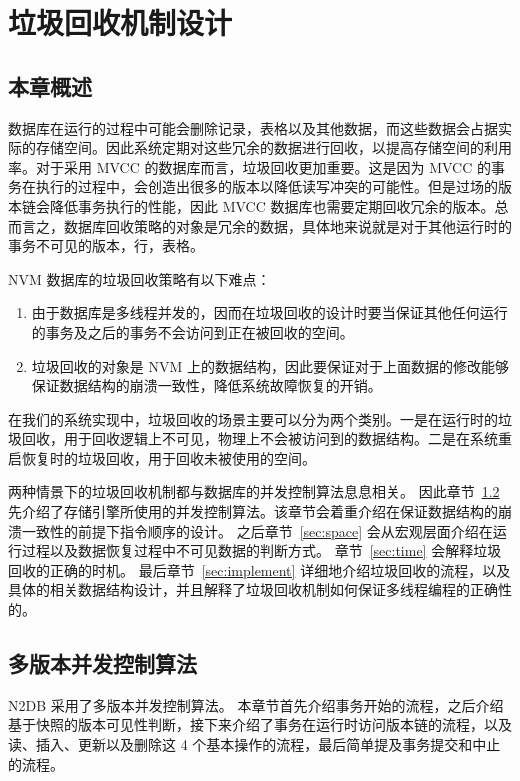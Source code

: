 
\chapter{垃圾回收机制设计}

\section{本章概述}


数据库在运行的过程中可能会删除记录，表格以及其他数据，而这些数据会占据实际的存储空间。因此系统定期对这些冗余的数据进行回收，以提高存储空间的利用率。对于采用 MVCC 的数据库而言，垃圾回收更加重要。这是因为 MVCC 的事务在执行的过程中，会创造出很多的版本以降低读写冲突的可能性。但是过场的版本链会降低事务执行的性能，因此 MVCC 数据库也需要定期回收冗余的版本。总而言之，数据库回收策略的对象是冗余的数据，具体地来说就是对于其他运行时的事务不可见的版本，行，表格。

NVM 数据库的垃圾回收策略有以下难点：

\begin{enumerate}
    \item 由于数据库是多线程并发的，因而在垃圾回收的设计时要当保证其他任何运行的事务及之后的事务不会访问到正在被回收的空间。
    \item 垃圾回收的对象是 NVM 上的数据结构，因此要保证对于上面数据的修改能够保证数据结构的崩溃一致性，降低系统故障恢复的开销。
\end{enumerate}

在我们的系统实现中，垃圾回收的场景主要可以分为两个类别。一是在运行时的垃圾回收，用于回收逻辑上不可见，物理上不会被访问到的数据结构。二是在系统重启恢复时的垃圾回收，用于回收未被使用的空间。

两种情景下的垃圾回收机制都与数据库的并发控制算法息息相关。
因此章节~\ref{sec:mvcc} 先介绍了存储引擎所使用的并发控制算法。该章节会着重介绍在保证数据结构的崩溃一致性的前提下指令顺序的设计。
之后章节~\ref{sec:space} 会从宏观层面介绍在运行过程以及数据恢复过程中不可见数据的判断方式。
章节~\ref{sec:time} 会解释垃圾回收的正确的时机。
最后章节~\ref{sec:implement} 详细地介绍垃圾回收的流程，以及具体的相关数据结构设计，并且解释了垃圾回收机制如何保证多线程编程的正确性的。

\section{多版本并发控制算法}
\label{sec:mvcc}
N2DB 采用了多版本并发控制算法。
本章节首先介绍事务开始的流程，之后介绍基于快照的版本可见性判断，接下来介绍了事务在运行时访问版本链的流程，以及读、插入、更新以及删除这 4 个基本操作的流程，最后简单提及事务提交和中止的流程。

